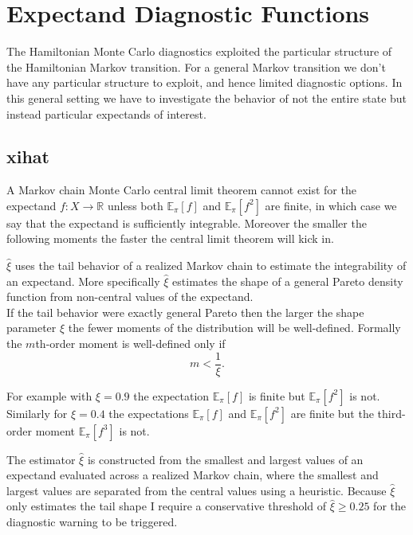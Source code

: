 \documentclass[
  letterpaper,
  DIV=11,
  numbers=noendperiod]{scrartcl}
\begin{document}
\hypertarget{expectand-diagnostic-functions}{%
\section{Expectand Diagnostic
Functions}\label{expectand-diagnostic-functions}}

The Hamiltonian Monte Carlo diagnostics exploited the particular
structure of the Hamiltonian Markov transition. For a general Markov
transition we don't have any particular structure to exploit, and hence
limited diagnostic options. In this general setting we have to
investigate the behavior of not the entire state but instead particular
expectands of interest.

\hypertarget{xihat}{%
\subsection{xihat}\label{xihat}}

A Markov chain Monte Carlo central limit theorem cannot exist for the
expectand \(f : X \rightarrow \mathbb{R}\) unless both
\(\mathbb{E}_{\pi}[f]\) and \(\mathbb{E}_{\pi}[f^{2}]\) are finite, in
which case we say that the expectand is sufficiently integrable.
Moreover the smaller the following moments the faster the central limit
theorem will kick in.

\(\hat{\xi}\) uses the tail behavior of a realized Markov chain to
estimate the integrability of an expectand. More specifically
\(\hat{\xi}\) estimates the shape of a general Pareto density function
from non-central values of the expectand.\\
If the tail behavior were exactly general Pareto then the larger the
shape parameter \(\xi\) the fewer moments of the distribution will be
well-defined. Formally the \(m\)th-order moment is well-defined only if
\[
m < \frac{1}{\xi}.
\]

For example with \(\xi = 0.9\) the expectation \(\mathbb{E}_{\pi}[f]\)
is finite but \(\mathbb{E}_{\pi}[f^{2}]\) is not. Similarly for
\(\xi = 0.4\) the expectations \(\mathbb{E}_{\pi}[f]\) and
\(\mathbb{E}_{\pi}[f^{2}]\) are finite but the third-order moment
\(\mathbb{E}_{\pi}[f^{3}]\) is not.

The estimator \(\hat{\xi}\) is constructed from the smallest and largest
values of an expectand evaluated across a realized Markov chain, where
the smallest and largest values are separated from the central values
using a heuristic. Because \(\hat{\xi}\) only estimates the tail shape I
require a conservative threshold of \(\hat{\xi} \ge 0.25\) for the
diagnostic warning to be triggered.
\end{document}

